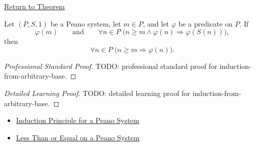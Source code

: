 \newpage
{}
\label{prf:induction-from-arbitrary-base}

\begin{remark*}[Return]
\hyperref[thm:induction-from-arbitrary-base]{Return to Theorem}
\end{remark*}

\begin{theorem*}
Let $(P,S,1)$ be a Peano system, let $m \in P$, and let $\varphi$ be a
predicate on $P$. If
\[
\varphi(m)
\qquad\text{and}\qquad
\forall n \in P\;\bigl(n \ge m \land \varphi(n) \Longrightarrow \varphi(S(n))\bigr),
\]
then
\[
\forall n \in P\;\bigl(n \ge m \Longrightarrow \varphi(n)\bigr).
\]
\end{theorem*}

\begin{proof}[Professional Standard Proof]
\LRAProofBodyStart
TODO: professional standard proof for induction-from-arbitrary-base.
\end{proof}

\begin{proof}[Detailed Learning Proof]
\LRAProofBodyStart
TODO: detailed learning proof for induction-from-arbitrary-base.
\end{proof}

\begin{remark*}
\end{remark*}

\begin{dependencies}
\begin{itemize}
  \item \hyperref[thm:induction-principle-for-peano-system]{Induction Principle for a Peano System}
  \item \hyperref[def:less-than-or-equal-on-peano-system]{Less Than or Equal on a Peano System}
\end{itemize}
\end{dependencies}

\clearpage
